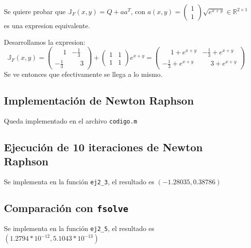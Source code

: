 \documentclass{endm}
\begin{document}
    Se quiere probar que $\mathbb{J}_F(x,y) = Q + aa^T$, con $a(x,y) = \begin{pmatrix} 1\\1 \end{pmatrix}\sqrt{e^{x+y}} \in \mathbb{R}^{2 \times 1}$
    es una expresion equivalente.
    
    Desarrollamos la expresion:
    \begin{equation}
        \mathbb{J}_F(x,y) = 
        \begin{pmatrix}
            \phantom{-}1 & -\frac{1}{3} \\
            -\frac{1}{3} & \phantom{-}3
        \end{pmatrix}
        +
        \begin{pmatrix} 1 & 1 \\ 1 & 1 \end{pmatrix} e^{x+y}
        =
        \begin{pmatrix}
            \phantom{-}1 + e^{x+y} & -\frac{1}{3} + e^{x+y} \\
            -\frac{1}{3} + e^{x+y} & \phantom{-}3 + e^{x+y}
        \end{pmatrix}
    \end{equation}
    Se ve entonces que efectivamente se llega a lo mismo.
\subsection{Implementación de Newton Raphson}
Queda implementado en el archivo \lstinline[style=mystyle]{codigo.m}
\subsection{Ejecución de 10 iteraciones de Newton Raphson}
Se implementa en la función \lstinline[style=mystyle]{ej2_3}, el resultado es $(-1.28035, 0.38786)$
\subsection{Comparación con \lstinline[style=mystyle]{fsolve}}
Se implementa en la función  \lstinline[style=mystyle]{ej2_5}, el resultado es $(1.2794*10^{-12},5.1043*10^{-13})$
\end{document}
